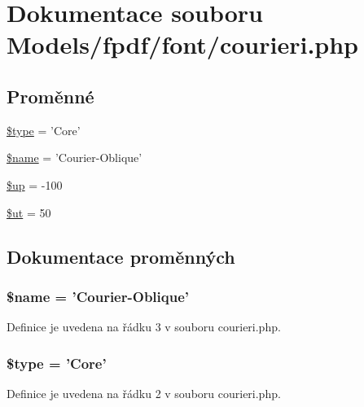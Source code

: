 \hypertarget{courieri_8php}{\section{Dokumentace souboru Models/fpdf/font/courieri.php}
\label{courieri_8php}
}
\subsection*{Proměnné}
\begin{DoxyCompactItemize}
\item 
\hyperlink{courieri_8php_a9a4a6fba2208984cabb3afacadf33919}{\$type} = 'Core'
\item 
\hyperlink{courieri_8php_ab2fc40d43824ea3e1ce5d86dee0d763b}{\$name} = 'Courier-\/Oblique'
\item 
\hyperlink{courieri_8php_a6b5ad2ac55f9df46e8f34e78fbd6f176}{\$up} = -\/100
\item 
\hyperlink{courieri_8php_aadd3f841051043ee58e587e840e8dd0b}{\$ut} = 50
\end{DoxyCompactItemize}


\subsection{Dokumentace proměnných}
\hypertarget{courieri_8php_ab2fc40d43824ea3e1ce5d86dee0d763b}{
\subsubsection[{\$name}]{\setlength{\rightskip}{0pt plus 5cm}\$name = 'Courier-\/Oblique'}}\label{courieri_8php_ab2fc40d43824ea3e1ce5d86dee0d763b}


Definice je uvedena na řádku 3 v souboru courieri.\-php.

\hypertarget{courieri_8php_a9a4a6fba2208984cabb3afacadf33919}{
\subsubsection[{\$type}]{\setlength{\rightskip}{0pt plus 5cm}\$type = 'Core'}}\label{courieri_8php_a9a4a6fba2208984cabb3afacadf33919}


Definice je uvedena na řádku 2 v souboru courieri.\-php.

